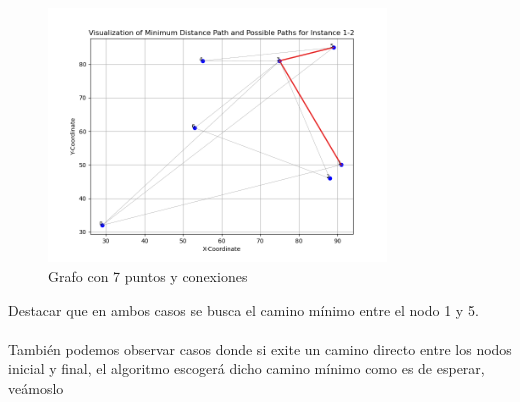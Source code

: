 \documentclass[11pt,openany]{book}
\begin{document}
\begin{figure}[H]
      \centering
      \includegraphics[width=0.8\textwidth]{assets/Img/GraficaCaminoMinimo-1-2.png}
      \caption{Grafo con 7 puntos y conexiones}
\end{figure}
Destacar que en ambos casos se busca el camino mínimo entre el nodo 1 y 5.\\ \\
También podemos observar casos donde si exite un camino directo entre los nodos inicial y final, el algoritmo escogerá dicho
camino mínimo como es de esperar, veámoslo
\end{document}
